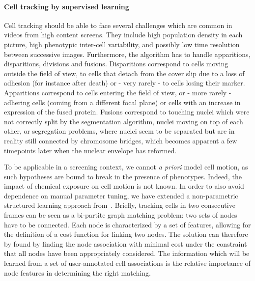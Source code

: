 \paragraph*{Cell tracking by supervised learning}
Cell tracking should be able to face several challenges which are
common in videos from high content screens. They
include high population density in each picture, high phenotypic
inter-cell variability, and possibly low time resolution between
successive images. Furthermore, the algorithm has to handle
apparitions, disparitions, divisions and fusions. Disparitions
correspond to cells moving outside the field of view, to cells that
detach from the cover slip due to a loss of adhesion (for instance
after death) or - very rarely - to cells losing their
marker. Apparitions correspond to cells entering the field of view,
or - more rarely - adhering cells (coming from a different focal
plane) or cells with an increase in expression of the fused
protein. Fusions correspond to touching nuclei which were
not correctly split by the segmentation algorithm, nuclei moving on
top of each other, or segregation problems, where nuclei seem to be
separated but are in reality still connected by chromosome bridges,
which becomes apparent a few timepoints later when the nuclear
envelope has reformed. 



To be applicable in a screening context, we cannot \textit{a priori}
model cell motion, as such hypotheses are bound to break in the
presence of phenotypes. Indeed, the impact of chemical exposure on
cell motion is not known. In order to also avoid dependence on manual
parameter tuning, we have extended a non-parametric structured
learning approach from~\cite{lou}. Briefly, tracking cells in two
consecutive frames can be seen as a bi-partite graph matching problem:
two sets of nodes have to be connected. Each node is
characterized by a set of features, allowing for the definition of a
cost function for linking two nodes. The solution can therefore by
found by finding the node association with minimal cost under the
constraint that all nodes have been appropriately considered. 
The information which will be learned from
a set of user-annotated cell associations is the relative importance
of node features in determining the right matching. 

